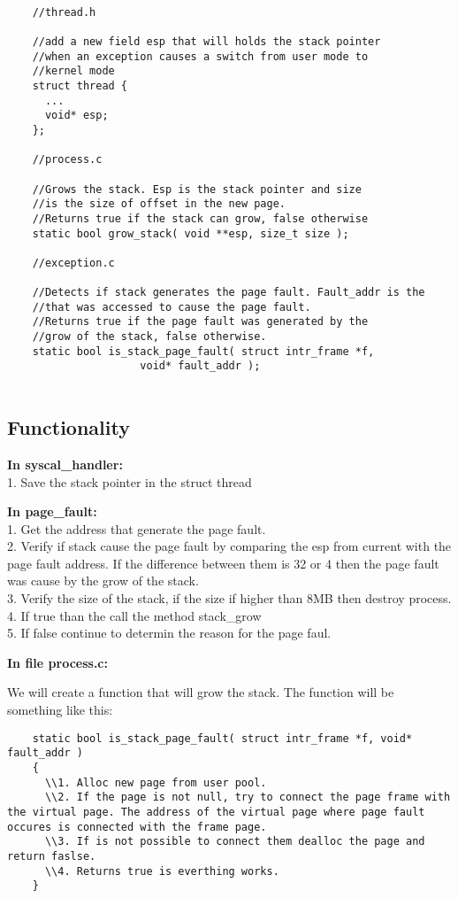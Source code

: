 \begin{lstlisting} 

	//thread.h

	//add a new field esp that will holds the stack pointer
	//when an exception causes a switch from user mode to
	//kernel mode
	struct thread {
	  ...
	  void* esp;
	};

	//process.c

	//Grows the stack. Esp is the stack pointer and size
	//is the size of offset in the new page.
	//Returns true if the stack can grow, false otherwise
	static bool grow_stack( void **esp, size_t size );

	//exception.c

	//Detects if stack generates the page fault. Fault_addr is the 
	//that was accessed to cause the page fault.
	//Returns true if the page fault was generated by the
	//grow of the stack, false otherwise.
	static bool is_stack_page_fault( struct intr_frame *f, 
					 void* fault_addr ); 
	
\end{lstlisting}


\subsection{Functionality}
 
\textbf{In syscal\_handler:}
	  \\1. Save the stack pointer in the struct thread

\textbf{In page\_fault:}
	  \\1. Get the address that generate the page fault.
	  \\2. Verify if stack cause the page fault by comparing the esp from current with the page fault address. If the difference between them is 32 or 4 then the page fault was cause by the grow of the stack.
	  \\3. Verify the size of the stack, if the size if higher than 8MB then destroy process.
	  \\4. If true than the call the method stack\_grow
	  \\5. If false continue to determin the reason for the page faul.

\textbf{In file process.c: }

We will create a function that will grow the stack. The function will be something like this:

\begin{lstlisting}
    static bool is_stack_page_fault( struct intr_frame *f, void* fault_addr )
    {
      \\1. Alloc new page from user pool.
      \\2. If the page is not null, try to connect the page frame with the virtual page. The address of the virtual page where page fault occures is connected with the frame page.
      \\3. If is not possible to connect them dealloc the page and return faslse.
      \\4. Returns true is everthing works.
    }
\end{lstlisting}


